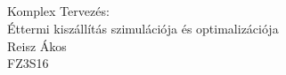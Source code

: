 \documentclass[12pt,a4paper]{article}
\begin{document}
\begin{flushleft}
\\
\end{flushleft}
\begin{flushleft}
\\
\end{flushleft}
\begin{flushleft}
\\
\end{flushleft}
\begin{flushleft}
\\
\end{flushleft}
\begin{flushleft}
\\
\end{flushleft}
\begin{flushleft}
\\
\end{flushleft}
\begin{flushleft}
\\
\end{flushleft}
\begin{flushleft}
\\
\end{flushleft}
\begin{flushleft}
\\
\end{flushleft}

\begin{center}
\begin{huge}

Komplex Tervezés: \\
Éttermi kiszállítás szimulációja és optimalizációja \\
Reisz Ákos \\
FZ3S16 \\

\end{huge}
\end{center}
\end{document}
